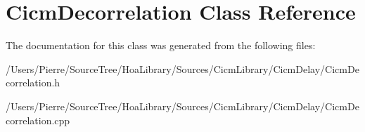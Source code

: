 \hypertarget{class_cicm_decorrelation}{\section{Cicm\-Decorrelation Class Reference}
\label{class_cicm_decorrelation}
}


The documentation for this class was generated from the following files\-:\begin{DoxyCompactItemize}
\item 
/\-Users/\-Pierre/\-Source\-Tree/\-Hoa\-Library/\-Sources/\-Cicm\-Library/\-Cicm\-Delay/Cicm\-Decorrelation.\-h\item 
/\-Users/\-Pierre/\-Source\-Tree/\-Hoa\-Library/\-Sources/\-Cicm\-Library/\-Cicm\-Delay/Cicm\-Decorrelation.\-cpp\end{DoxyCompactItemize}
